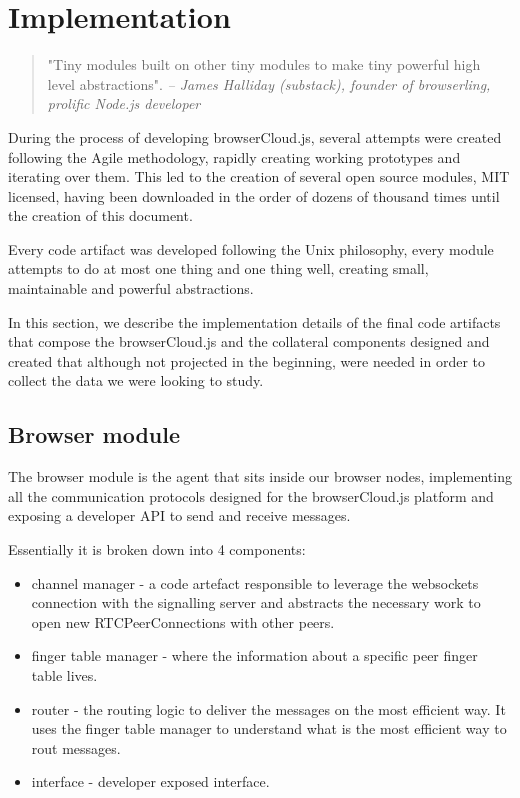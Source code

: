 \chapter{Implementation}\label{ch:implemenation}

\begin{quotation}
"Tiny modules built on other tiny modules to make tiny powerful high level abstractions".
{\small\it -- James Halliday (substack), founder of browserling, prolific Node.js developer}
\end{quotation}

During the process of developing browserCloud.js, several attempts were created following the Agile methodology, rapidly creating working prototypes and iterating over them. This led to the creation of several open source modules, MIT licensed, having been downloaded in the order of dozens of thousand times until the creation of this document.

Every code artifact was developed following the Unix philosophy, every module attempts to do at most one thing and one thing well, creating small, maintainable and powerful abstractions.

In this section, we describe the implementation details of the final code artifacts that compose the browserCloud.js and the collateral components designed and created that although not projected in the beginning, were needed in order to collect the data we were looking to study.

\section{Browser module}

The browser module is the agent that sits inside our browser nodes, implementing all the communication protocols designed for the browserCloud.js platform and exposing a developer API to send and receive messages.

Essentially it is broken down into 4 components:

\begin{itemize}
    \item channel manager - a code artefact responsible to leverage the websockets connection with the signalling server and abstracts the necessary work to open new RTCPeerConnections with other peers.
    \item finger table manager - where the information about a specific peer finger table lives.
    \item router - the routing logic to deliver the messages on the most efficient way. It uses the finger table manager to understand what is the most efficient way to rout messages.
    \item interface - developer exposed interface.
\end{itemize}

